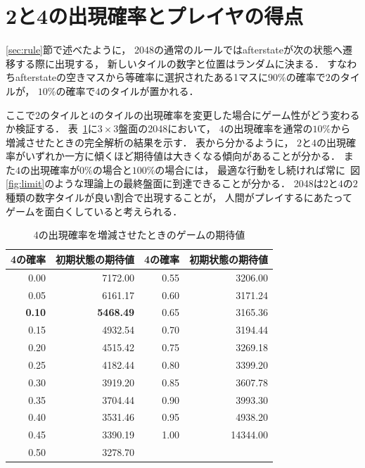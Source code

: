 \section{2と4の出現確率とプレイヤの得点}
\ref{sec:rule}節で述べたように， 2048の通常のルールではafterstateが次の状態へ遷移する際に出現する， 新しいタイルの数字と位置はランダムに決まる．
すなわちafterstateの空きマスから等確率に選択されたある1マスに$90\%$の確率で$2$のタイルが， $10\%$の確率で$4$のタイルが置かれる．

ここで$2$のタイルと$4$のタイルの出現確率を変更した場合にゲーム性がどう変わるか検証する．
表~\ref{table: value_table}に$3 \times 3$盤面の2048において， $4$の出現確率を通常の$10\%$から増減させたときの完全解析の結果を示す．
表から分かるように， $2$と$4$の出現確率がいずれか一方に傾くほど期待値は大きくなる傾向があることが分かる．
また$4$の出現確率が$0\%$の場合と$100\%$の場合には， 最適な行動をし続ければ常に~図\ref{fig:limit}のような理論上の最終盤面に到達できることが分かる．
2048は$2$と$4$の$2$種類の数字タイルが良い割合で出現することが， 人間がプレイするにあたってゲームを面白くしていると考えられる．
\begin{table}[t]
\caption{4の出現確率を増減させたときのゲームの期待値}
\label{table: value_table}
\centering
\begin{tabular}{r|r||r|r}
    \hline \hline
    4の確率 & 初期状態の期待値 & 4の確率 & 初期状態の期待値 \\ \hline 
    0.00 & 7172.00 & 0.55 & 3206.00 \\
    0.05 & 6161.17 & 0.60 & 3171.24 \\
    \textbf{0.10} & \textbf{5468.49} & 0.65 & 3165.36 \\
    0.15 & 4932.54 & 0.70 & 3194.44 \\
    0.20 & 4515.42 & 0.75 & 3269.18 \\
    0.25 & 4182.44 & 0.80 & 3399.20 \\
    0.30 & 3919.20 & 0.85 & 3607.78 \\
    0.35 & 3704.44 & 0.90 & 3993.30 \\
    0.40 & 3531.46 & 0.95 & 4938.20 \\
    0.45 & 3390.19 & 1.00 & 14344.00 \\
    0.50 & 3278.70 &  & \\
    \hline
\end{tabular}
\end{table}

